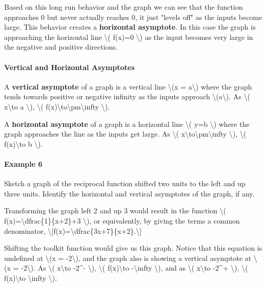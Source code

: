 Based on this long run behavior and the graph we can see that the
function approaches 0 but never actually reaches 0, it just "levels off"
as the inputs become large. This behavior creates a \textbf{horizontal
asymptote}. In this case the graph is approaching the horizontal line
\textbackslash{}( f(x)=0 \textbackslash{}) as the input becomes very
large in the negative and positive directions.

\hypertarget{vertical-and-horizontal-asymptotes}{%
\paragraph{Vertical and Horizontal
Asymptotes}\label{vertical-and-horizontal-asymptotes}}

A \textbf{vertical asymptote} of a graph is a vertical line
\textbackslash{}(x = a\textbackslash{}) where the graph tends towards
positive or negative infinity as the inputs approach
\textbackslash{}(a\textbackslash{}). As \textbackslash{}(
x\textbackslash{}to a \textbackslash{}), \textbackslash{}(
f(x)\textbackslash{}to\textbackslash{}pm\textbackslash{}infty
\textbackslash{}).

A \textbf{horizontal asymptote} of a graph is a horizontal line
\textbackslash{}( y=b \textbackslash{}) where the graph approaches the
line as the inputs get large. As \textbackslash{}(
x\textbackslash{}to\textbackslash{}pm\textbackslash{}infty
\textbackslash{}), \textbackslash{}( f(x)\textbackslash{}to b
\textbackslash{}).

\hypertarget{example-6}{%
\paragraph{Example 6}\label{example-6}}

Sketch a graph of the reciprocal function shifted two units to the left
and up three units. Identify the horizontal and vertical asymptotes of
the graph, if any.

Transforming the graph left 2 and up 3 would result in the function
\textbackslash{}( f(x)=\textbackslash{}dfrac\{1\}\{x+2\}+3
\textbackslash{}), or equivalently, by giving the terms a common
denominator,
\textbackslash{}{[}f(x)=\textbackslash{}dfrac\{3x+7\}\{x+2\}.\textbackslash{}{]}

Shifting the toolkit function would give us this graph. Notice that this
equation is undefined at \textbackslash{}(x = -2\textbackslash{}), and
the graph also is showing a vertical asymptote at \textbackslash{}(x =
-2\textbackslash{}). As \textbackslash{}( x\textbackslash{}to -2\^{}-
\textbackslash{}), \textbackslash{}( f(x)\textbackslash{}to
-\textbackslash{}infty \textbackslash{}), and as \textbackslash{}(
x\textbackslash{}to -2\^{}+ \textbackslash{}), \textbackslash{}(
f(x)\textbackslash{}to \textbackslash{}infty \textbackslash{}).

